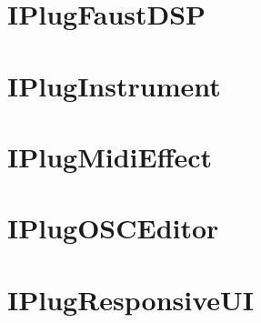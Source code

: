 \let\mypdfximage\pdfximage\def\pdfximage{\immediate\mypdfximage}\documentclass[twoside]{book}
\newcommand{\+}{\discretionary{\mbox{\scriptsize$\hookleftarrow$}}{}{}}
\begin{document}
\chapter{I\+Plug\+Faust\+D\+SP}
\label{md__c_1__users_fab_src__github_branches__neural_amp_modeler_plugin_i_plug2__examples__i_plug_faust_d_s_p__r_e_a_d_m_e}

\chapter{I\+Plug\+Instrument}
\label{md__c_1__users_fab_src__github_branches__neural_amp_modeler_plugin_i_plug2__examples__i_plug_instrument__r_e_a_d_m_e}

\chapter{I\+Plug\+Midi\+Effect}
\label{md__c_1__users_fab_src__github_branches__neural_amp_modeler_plugin_i_plug2__examples__i_plug_midi_effect__r_e_a_d_m_e}

\chapter{I\+Plug\+O\+S\+C\+Editor}
\label{md__c_1__users_fab_src__github_branches__neural_amp_modeler_plugin_i_plug2__examples__i_plug_o_s_c_editor__r_e_a_d_m_e}

\chapter{I\+Plug\+Responsive\+UI}
\label{md__c_1__users_fab_src__github_branches__neural_amp_modeler_plugin_i_plug2__examples__i_plug_responsive_u_i__r_e_a_d_m_e}

\end{document}
